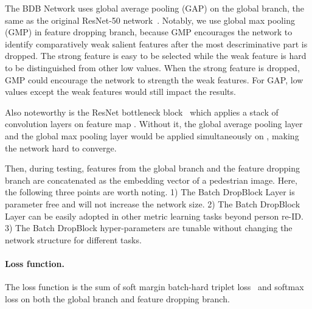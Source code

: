 \documentclass[10pt,twocolumn,letterpaper]{article}
\begin{document}
The BDB Network uses global average pooling (GAP) on the global branch, the same as the original ResNet-50 network~\cite{he2016resnet}. Notably, we use global max pooling (GMP) in feature dropping branch, because GMP encourages the network to identify comparatively weak salient features after the most descriminative part is dropped.
The strong feature is easy to be selected while the weak feature is hard to be distinguished from other low values. When the strong feature is dropped, GMP could encourage the network to strength the weak features. For GAP, low values except the weak features would still impact the results.

Also noteworthy is the ResNet bottleneck block~\cite{he2016resnet} which applies a stack of convolution layers on feature map .
Without it, the global average pooling layer and the global max pooling layer would be applied simultaneously on , making the network hard to converge.



Then, \textcolor{myRed}{during testing,} features from the global branch and the feature dropping branch are concatenated as the embedding vector of a pedestrian image. Here, the following three points are worth noting.
1) The Batch DropBlock Layer is parameter free and will not increase the network size.
2) The Batch DropBlock Layer can be easily adopted in other metric learning tasks beyond person re-ID.
3) The Batch DropBlock hyper-parameters are tunable without changing the network structure for different tasks.

\paragraph{Loss function.}\vspace{-3mm}
The loss function is the sum of soft margin batch-hard triplet loss~\cite{hermans2017defense} and softmax loss on both the global branch and feature dropping branch. 

\iffalse
Specifically, the soft margin batch-hard triplet loss  is defined as

 
where  is the number of distinct persons and  is the number of images for each person so there are  triplets in a batch.  denotes the batch-hard triplet loss. For each anchor image , we select the image from the same identity  with the maximum distance as the positive image , and select the image from a different identity  with the minimum distance as the negative image . Therefore, , , and  form a triplet.  is the sum of the soft margin batch-hard triplet loss for all the triplets in a batch.  denotes the Euclidean distance function and  is the feature embedding learned by the BDB Network.
\fi 
\end{document}

